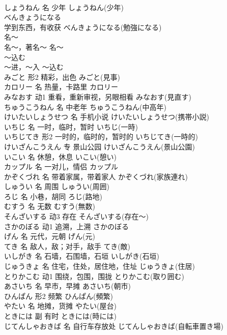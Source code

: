 \documentclass[8pt]{extreport}
\begin{document}
\begin{CJK}{UTF8}{min}
\\	しょうねん	名	少年	しょうねん(少年)	
\\	べんきょうになる	
\\	学到东西，有收获	べんきょうになる(勉強になる)	
\\	名～	
\\	名～，著名～	名～	
\\	～込む	
\\	～进，～入	～込む	
\\	みごと	形2	精彩，出色	みごと(見事)	
\\	カロリー	名	热量，卡路里	カロリー	
\\	みなおす	动1	重看，重新审视，另眼相看	みなおす(見直す)	
\\	ちゅうこうねん	名	中老年	ちゅうこうねん(中高年)	
\\	けいたいしょうせつ	名	手机小说	けいたいしょうせつ(携帯小説)	
\\	いちじ	名	一时，临时，暂时	いちじ(一時)	
\\	いちじてき	形2	一时的，临时的，暂时的	いちじてき(一時的)	
\\	けいざんこうえん	专	景山公园	けいざんこうえん(景山公園)	
\\	いこい	名	休憩，休息	いこい(憩い)	
\\	カップル	名	一对儿，情侣	カップル	
\\	かぞくづれ	名	带着家属，带着家人	かぞくづれ(家族連れ)	
\\	しゅうい	名	周围	しゅうい(周囲)	
\\	ろじ	名	小巷，胡同	ろじ(路地)	
\\	むすう	名	无数	むすう(無数)	
\\	そんざいする	动3	存在	そんざいする(存在～)	
\\	さかのぼる	动1	追溯，上溯	さかのぼる	
\\	げん	名	元代，元朝	げん(元)	
\\	てき	名	敌人，敌；对手，敌手	てき(敵)	
\\	いしがき	名	石墙，石围墙，石垣	いしがき(石垣)	
\\	じゅうきょ	名	住宅，住处，居住地，住址	じゅうきょ(住居)	
\\	とりかこむ	动1	围绕，包围，围拢	とりかこむ(取り囲む)	
\\	あさいち	名	早市，早摊	あさいち(朝市)	
\\	ひんぱん	形2	频繁	ひんぱん(頻繁)	
\\	やたい	名	地摊，货摊	やたい(屋台)	
\\	ときには	副	有时	ときには(時には)	
\\	じてんしゃおきば	名	自行车存放处	じてんしゃおきば(自転車置き場)	

\end{CJK}
\end{document}

